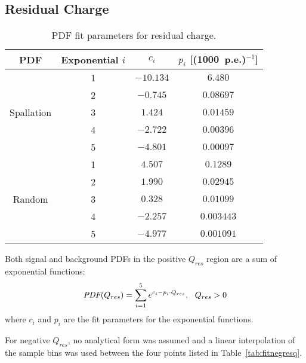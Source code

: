 \subsection{Residual Charge}

\begin{table}[hbt]
\centering
\caption{PDF fit parameters for residual charge.}
\begin{tabular}{cccc}
\toprule
PDF & Exponential $i$ & $c_i$ & $p_i$ [(1000~p.e.)$^{-1}$] \\
\hline

           & 1 & $-10.134$ & $6.480$    \\
           & 2 & $-0.745$ & $0.08697$ \\
Spallation & 3 &  $1.424$ & $0.01459$ \\
           & 4 & $-2.722$ & $0.00396$ \\
           & 5 & $-4.801$ & $0.00097$ \\
\hline
           & 1 &  $4.507$ & $0.1289$   \\
           & 2 &  $1.990$ & $0.02945$  \\
Random     & 3 &  $0.328$ & $0.01099$  \\
           & 4 & $-2.257$ & $0.003443$ \\
           & 5 & $-4.977$ & $0.001091$ \\
\bottomrule        %
\end{tabular}
\label{tab:fitresq}
\end{table}

Both signal and background PDFs in the positive $Q_{res}$ region are a sum of exponential functions:
\begin{equation}
\mbox{\it PDF}(Q_{res}) =\sum^5_{i=1} e^{c_i - p_i\cdot Q_{res}}, \ \ Q_{res} > 0
\end{equation}
where $c_i$ and $p_i$ are the fit parameters for the exponential functions. 


For negative $Q_{res}$, no analytical form was assumed and a linear interpolation of the sample bins was used between the four points listed in Table~\ref{tab:fitnegresq}.

